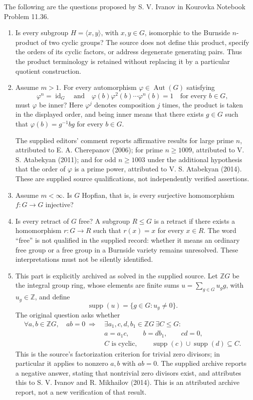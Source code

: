 \documentclass[11pt]{article}
\newcommand{\Z}{\mathbb{Z}}
\begin{document}
The following are the questions proposed by S. V. Ivanov in Kourovka Notebook Problem 11.36.
\begin{enumerate}
\item[(a)] Is every subgroup \(H=\langle x,y\rangle\), with \(x,y\in G\), isomorphic to the Burnside \(n\)-product of two cyclic groups? The source does not define this product, specify the orders of its cyclic factors, or address degenerate generating pairs. Thus the product terminology is retained without replacing it by a particular quotient construction.
\item[(b)] Assume \(m>1\). For every automorphism \(\varphi\in\operatorname{Aut}(G)\) satisfying
\[
\varphi^n=\operatorname{id}_G
\quad\text{and}\quad
\varphi(b)\varphi^2(b)\cdots\varphi^n(b)=1
\quad\text{for every }b\in G,
\]
must \(\varphi\) be inner? Here \(\varphi^j\) denotes composition \(j\) times, the product is taken in the displayed order, and being inner means that there exists \(g\in G\) such that \(\varphi(b)=g^{-1}bg\) for every \(b\in G\).

The supplied editors' comment reports affirmative results for large prime \(n\), attributed to E. A. Cherepanov (2006); for prime \(n\ge1009\), attributed to V. S. Atabekyan (2011); and for odd \(n\ge1003\) under the additional hypothesis that the order of \(\varphi\) is a prime power, attributed to V. S. Atabekyan (2014). These are supplied source qualifications, not independently verified assertions.
\item[(c)] Assume \(m<\infty\). Is \(G\) Hopfian, that is, is every surjective homomorphism \(f:G\to G\) injective?
\item[(d)] Is every retract of \(G\) free? A subgroup \(R\le G\) is a retract if there exists a homomorphism \(r:G\to R\) such that \(r(x)=x\) for every \(x\in R\). The word ``free'' is not qualified in the supplied record: whether it means an ordinary free group or a free group in a Burnside variety remains unresolved. These interpretations must not be silently identified.
\item[(e)] This part is explicitly archived as solved in the supplied source. Let \(\Z G\) be the integral group ring, whose elements are finite sums \(u=\sum_{g\in G}u_g g\), with \(u_g\in\Z\), and define
\[
\operatorname{supp}(u)=\{g\in G:u_g\ne0\}.
\]
The original question asks whether
\[
\begin{aligned}
\forall a,b\in\Z G,\quad ab=0\ \Longrightarrow\ 
&\exists a_1,c,d,b_1\in\Z G\ \exists C\le G:\\
&a=a_1c,\qquad b=db_1,\qquad cd=0,\\
&C\text{ is cyclic},\qquad
\operatorname{supp}(c)\cup\operatorname{supp}(d)\subseteq C.
\end{aligned}
\]
This is the source's factorization criterion for trivial zero divisors; in particular it applies to nonzero \(a,b\) with \(ab=0\). The supplied archive reports a negative answer, stating that nontrivial zero divisors exist, and attributes this to S. V. Ivanov and R. Mikhailov (2014). This is an attributed archive report, not a new verification of that result.
\end{enumerate}
\end{document}
